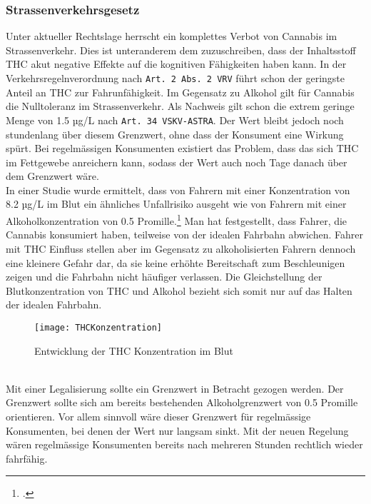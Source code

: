 \documentclass[../main.tex]{subfiles}
\begin{document}
	 	 
	 \subsubsection{Strassenverkehrsgesetz}
	 Unter aktueller Rechtslage herrscht ein komplettes Verbot von Cannabis im Strassenverkehr. 
	 Dies ist unteranderem dem zuzuschreiben, dass der Inhaltsstoff THC akut negative Effekte auf die kognitiven Fähigkeiten haben kann.	 
	 In der Verkehrsregelnverordnung nach \texttt{Art. 2 Abs. 2 VRV} führt schon der geringste Anteil an THC zur Fahrunfähigkeit.
	 Im Gegensatz zu Alkohol gilt für Cannabis die Nulltoleranz im Strassenverkehr.
	 Als Nachweis gilt schon die extrem geringe Menge von 1.5 µg/L nach \texttt{Art. 34 VSKV-ASTRA}.
	 Der Wert bleibt jedoch noch stundenlang über diesem Grenzwert, ohne dass der Konsument eine Wirkung spürt.
	 Bei regelmässigen Konsumenten existiert das Problem, dass das sich THC im Fettgewebe anreichern kann, sodass der Wert auch noch Tage danach über dem Grenzwert wäre. \\
	 
	 \noindent	 
	 In einer Studie wurde ermittelt, dass von Fahrern mit einer Konzentration von 8.2 µg/L im Blut ein ähnliches Unfallrisiko ausgeht wie von Fahrern mit einer Alkoholkonzentration von 0.5 Promille.\footcite{hartman-2015}
	 Man hat festgestellt, dass Fahrer, die Cannabis konsumiert haben, teilweise von der idealen Fahrbahn abwichen.
	 Fahrer mit THC Einfluss stellen aber im Gegensatz zu alkoholisierten Fahrern dennoch eine kleinere Gefahr dar, da sie keine erhöhte Bereitschaft zum Beschleunigen zeigen und die Fahrbahn nicht häufiger verlassen.
	 Die Gleichstellung der Blutkonzentration von THC und Alkohol bezieht sich somit nur auf das Halten der idealen Fahrbahn.\\
	 
	 
	 \noindent	 
	 \begin{figure}[H]
	 	\centering
		\texttt{[image: THCKonzentration]}
		\captionsetup{font=small}
		\caption[Entwicklung der THC Konzentration im Blut]{Entwicklung der THC Konzentration im Blut\protect\footnotemark}		
	 \end{figure}
	
	 
	 \noindent \\
	 Mit einer Legalisierung sollte ein Grenzwert in Betracht gezogen werden.
	 Der Grenzwert sollte sich am bereits bestehenden Alkoholgrenzwert von 0.5 Promille orientieren. 
	 Vor allem sinnvoll wäre dieser Grenzwert für regelmässige Konsumenten, bei denen der Wert nur langsam sinkt.
	 Mit der neuen Regelung wären regelmässige Konsumenten bereits nach mehreren Stunden rechtlich wieder fahrfähig.
	 
\end{document}
